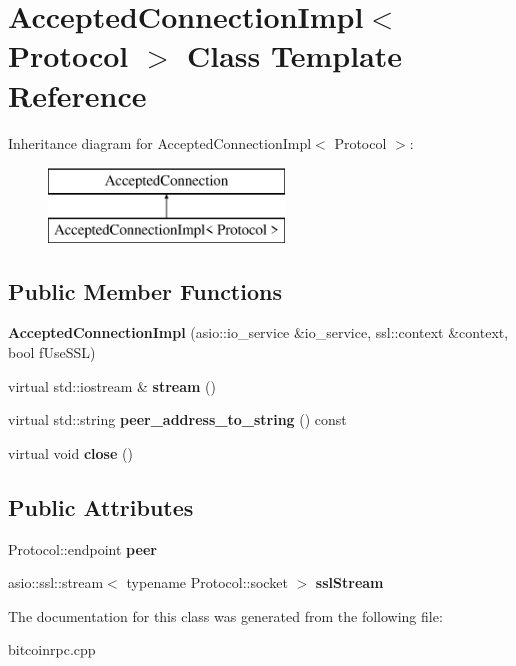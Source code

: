 \hypertarget{class_accepted_connection_impl}{}\section{Accepted\+Connection\+Impl$<$ Protocol $>$ Class Template Reference}
\label{class_accepted_connection_impl}
Inheritance diagram for Accepted\+Connection\+Impl$<$ Protocol $>$\+:\begin{figure}[H]
\begin{center}
\leavevmode
\includegraphics[height=2.000000cm]{class_accepted_connection_impl}
\end{center}
\end{figure}
\subsection*{Public Member Functions}
\begin{DoxyCompactItemize}
\item 
\mbox{\label{class_accepted_connection_impl_adaf674801c89a76de0bbb4154f2cf3b8}} 
{\bfseries Accepted\+Connection\+Impl} (asio\+::io\+\_\+service \&io\+\_\+service, ssl\+::context \&context, bool f\+Use\+S\+SL)
\item 
\mbox{\label{class_accepted_connection_impl_ab15396a413e40f947b7d527a2afe37fa}} 
virtual std\+::iostream \& {\bfseries stream} ()
\item 
\mbox{\label{class_accepted_connection_impl_ac9842ed342c2cbabb9c0dc4f7e1e9d0a}} 
virtual std\+::string {\bfseries peer\+\_\+address\+\_\+to\+\_\+string} () const
\item 
\mbox{\label{class_accepted_connection_impl_a1b114863c047cae57ce42564f9a29be1}} 
virtual void {\bfseries close} ()
\end{DoxyCompactItemize}
\subsection*{Public Attributes}
\begin{DoxyCompactItemize}
\item 
\mbox{\label{class_accepted_connection_impl_ade939b7d2778690cf78a9f6719f47c76}} 
Protocol\+::endpoint {\bfseries peer}
\item 
\mbox{\label{class_accepted_connection_impl_afcfc99c020d301985bc19b4075fc7e78}} 
asio\+::ssl\+::stream$<$ typename Protocol\+::socket $>$ {\bfseries ssl\+Stream}
\end{DoxyCompactItemize}


The documentation for this class was generated from the following file\+:\begin{DoxyCompactItemize}
\item 
bitcoinrpc.\+cpp\end{DoxyCompactItemize}

